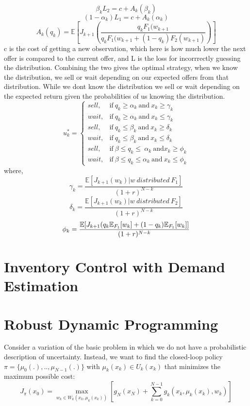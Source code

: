 \documentclass[11pt, oneside]{article}   	%
\begin{document}
$$\beta_{k}L_{2}=c+A_{k}(\beta_{k})$$
$$(1-\alpha_{k})L_{1}=c+A_{k}(\alpha_{k})$$
$$A_{k}(q_{k})=\mathbb{E}[J_{k+1}(\frac{q_{k}F_{1}(w_{k+1}}{q_{k}F_{1}(w_{k+1} + (1-q_{k})F_{2}(w_{k+1})})]$$
c is the cost of getting a new observation, which here is how much lower the next offer is compared to the current offer, and L is the loss for incorrrectly guessing the distribution.
Combining the two gives the optimal strategy, when we know the distribution, we sell or wait depending on our expected offers from that distribution. While we dont know the distribution we sell or wait depending on the expected return given the probabilities of us knowing the distribution.
\begin{equation}
    u^{*}_{k}=
    \begin{cases}
      sell, & \text{if}\ q_{k} \geq \alpha_{k} ~\text{and}~ x_{k} \geq \gamma_{k}\\
      wait, & \text{if}\ q_{k} \geq \alpha_{k}~ \text{and} ~x_{k} \leq \gamma_{k}\\
      sell, & \text{if}\ q_{k} \leq \beta_{k} ~\text{and}~ x_{k} \geq \delta_{k}\\
      wait, & \text{if}\ q_{k} \leq \beta_{k}~ \text{and} ~x_{k} \leq \delta_{k}\\
      sell, & \text{if}\ \beta \leq q_{k} \leq ~\alpha_{k}~ \text{and} x_{k} \geq \phi_{k}  \\
      wait, & \text{if}\ \beta \leq q_{k} \leq \alpha_{k}~ \text{and} ~x_{k} \leq \phi_{k}
    \end{cases}
  \end{equation}
where,
$$
\gamma_{k} = \frac{\mathbb{E}[J_{k+1}(w_{k})| w ~distributed~ F_{1}]}{(1+r)^{N-k}} $$
$$
\delta_{k} = \frac{\mathbb{E}[J_{k+1}(w_{k})| w~distributed~  F_{2}]}{(1+r)^{N-k}} $$
$$
\phi_{k} = \frac{\mathbb{E}[J_{k+1}(q_{k}\mathbb{E}_{F_{1}}[w_{k}]+(1-q_{k})\mathbb{E}_{F_{1}}[w_{k}]]}{(1+r)^{N-k}} \\
$$


\section{Inventory Control with Demand Estimation}


\section{Robust Dynamic Programming}
Consider a variation of the basic problem in which we do not have a probabilistic description of uncertainty. Instead, we want to find the closed-loop policy $\pi = \{\mu_0(.),..,\mu_{N-1}(.)\}$ with $\mu_k(x_k) \in U_k(x_k)$ that minimizes the maximum possible cost:
$$
J_{\pi}(x_0) = \max_{w_k \in W_k(x_k,\mu_k(x_k))} \left[ g_N(x_N) + \sum_{k=0}^{N-1} g_k(x_k,\mu_k(x_k), w_k)\right]
$$
\end{document}
